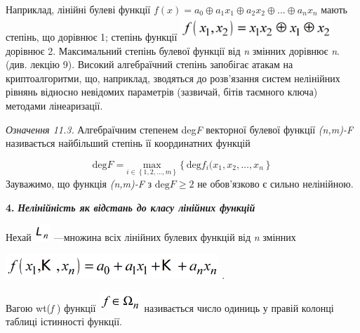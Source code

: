 Наприклад, лінійні булеві функції  
${f(x)=a_{{0}}{\oplus}a_{{1}}x_{{1}}{\oplus}a_{{2}}x_{{2}}{\oplus}\dots{\oplus}a_{{n}}x_{{n}}}$
мають степінь, що дорівнює 1; степінь функції 
\includegraphics[width=2.248in,height=0.3583in]{crypt-img/crypt-img258.png}  
дорівнює  2. Максимальний степінь булевої функції від \textit{n} змінних
дорівнює \textit{n}. (див. лекцію 9). Високий алгебраїчний степінь запобігає
атакам на криптоалгоритми, що, наприклад, зводяться до розв’язання систем
нелінійних рівнянь відносно невідомих параметрів (зазвичай, бітів таємного
ключа) методами лінеаризації. 

 \textit{Означення 11.3.} Алгебраїчним степенем deg\textit{F}\textit{ }
векторної булевої функції 
\textit{(}\textit{n}\textit{,}\textit{m}\textit{)-}\textit{F}\textit{ 
}називається найбільший степінь її координатних функцій

\begin{equation*}
{\text{deg}F=\underset{{i\in
\left\{1,2,\dots,m\right\}}}{{\text{max}}}\left\{\text{deg}f_{{i}}(x_{{1}},x_{{2}},\dots,x_{{n}}\right\}}
\end{equation*}
Зауважимо, що функція
\textit{(}\textit{n}\textit{,}\textit{m}\textit{)-}\textit{F}\textit{ } з 
${\text{deg}F\ge 2}$ не обов’язково є сильно нелінійною.


\bigskip

\textbf{4.} \textbf{\textit{Нелінійність як відстань до класу лінійних функцій}}

Нехай 
\includegraphics[width=0.2362in,height=0.25in]{crypt-img/crypt-img259.png} 
---множина всіх лінійних булевих функцій від \textit{n}\textit{ }змінних 

{\centering
 \includegraphics[width=3.1618in,height=0.3693in]{crypt-img/crypt-img260.png} .
\par}

 Вагою wt(\textit{f}\textit{ })\textit{ }функції 
\includegraphics[width=0.6217in,height=0.2874in]{crypt-img/crypt-img261.png} 
називається число одиниць у правій колонці таблиці істинності функції.

